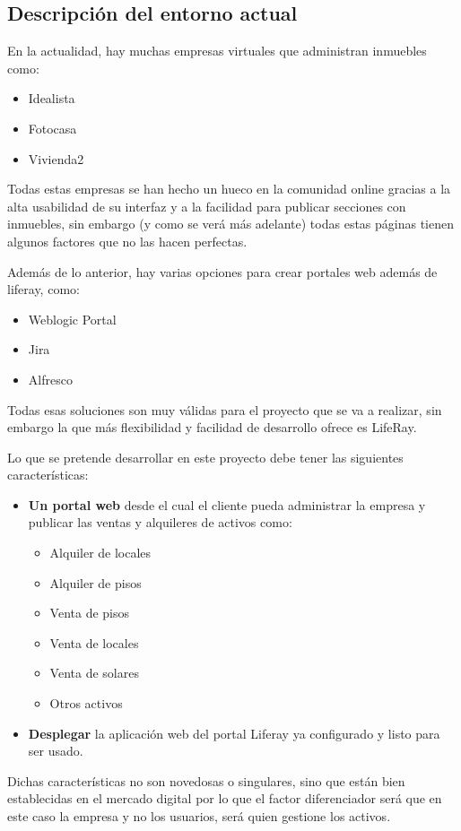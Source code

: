 \subsection{Descripción del entorno actual}
\par En la actualidad, hay muchas empresas virtuales que administran inmuebles como:
\begin{itemize}
	\item Idealista
	\item Fotocasa
	\item Vivienda2
\end{itemize}

\par Todas estas empresas se han hecho un hueco en la comunidad online gracias a la alta usabilidad de su interfaz y a la facilidad para publicar secciones con inmuebles, sin embargo (y como se verá más adelante) todas estas páginas tienen algunos factores que no las hacen perfectas.

\par Además de lo anterior, hay varias opciones para crear portales web además de liferay, como:
\begin{itemize}
	\item Weblogic Portal
	\item Jira
	\item Alfresco
\end{itemize}

\par Todas esas soluciones son muy válidas para el proyecto que se va a realizar, sin embargo la que más flexibilidad y facilidad de desarrollo ofrece es LifeRay.

\par Lo que se pretende desarrollar en este proyecto debe tener las siguientes características:
\begin{itemize}
	\item \textbf{Un portal web} desde el cual el cliente pueda administrar la empresa y publicar las ventas y alquileres de activos como:
	\begin{itemize}
	 	\item Alquiler de locales
	 	\item Alquiler de pisos
	 	\item Venta de pisos
	 	\item Venta de locales
	 	\item Venta de solares
	 	\item Otros activos
	 \end{itemize}
	 \item \textbf{Desplegar} la aplicación web del portal Liferay ya configurado y listo para ser usado.
\end{itemize}
\par Dichas características no son novedosas o singulares, sino que están bien establecidas en el mercado digital por lo que el factor diferenciador será que en este caso la empresa y no los usuarios, será quien gestione los activos.